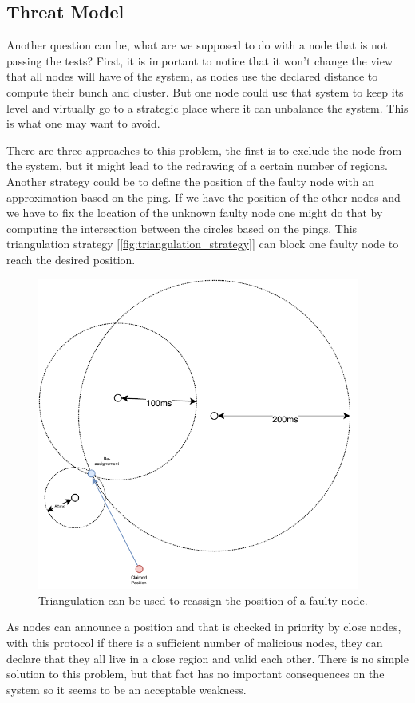 \documentclass[a4paper,11pt,oneside]{report}
\begin{document}
\subsection{Threat Model}
Another question can be, what are we supposed to do with a node that is not
passing the tests? First, it is important to notice that it won't change the
view that all nodes will have of the system, as nodes use the declared distance
to compute their bunch and cluster. But one node could use that system to keep
its level and virtually go to a strategic place where it can unbalance the
system.  This is what one may want to avoid. 

There are three approaches to this problem, the first is to exclude the node
from the system, but it might lead to the redrawing of a certain number of
regions. Another strategy could be to define the position of the faulty node
with an approximation based on the ping. If we have the position of the other
nodes and we have to fix the location of the unknown faulty node one might do
that by computing the intersection between the circles based on the pings. This
triangulation strategy [\autoref{fig:triangulation_strategy}] can block one
faulty node to reach the desired position. 

\begin{figure}[!h] \centering
    \includegraphics[width=300pt]{figures/triangulation_strategy}
    \caption{Triangulation can be used to reassign the position of a faulty
    node. }
\label{fig:triangulation_strategy}
\end{figure}

As nodes can announce a position and that is checked in priority by close
nodes, with this protocol if there is a sufficient number of malicious nodes,
they can declare that they all live in a close region and valid each other.
There is no simple solution to this problem, but that fact has no important consequences
on the system so it seems to be an acceptable weakness.
\end{document}

